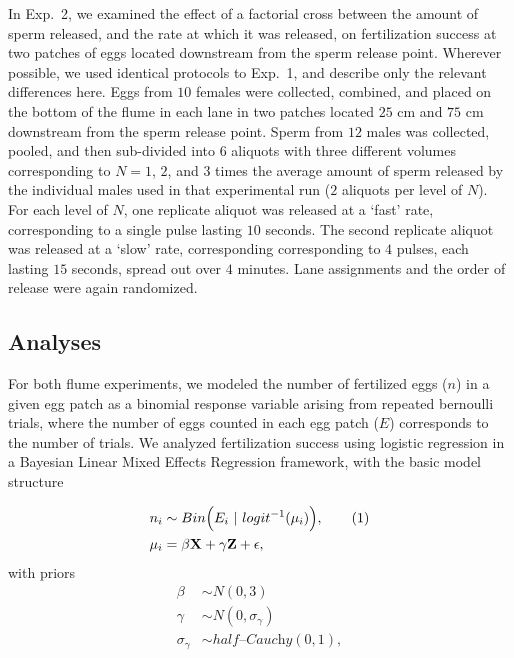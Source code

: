 \documentclass{article}
\newcommand\numberthis{\addtocounter{equation}{1}\tag{\theequation}}
\begin{document}
	In Exp.~2, we examined the effect of a factorial cross between the amount of sperm released, and the rate at which it was released, on fertilization success at two patches of eggs located downstream from the sperm release point. Wherever possible, we used identical protocols to Exp.~1, and describe only the relevant differences here. Eggs from $10$ females were collected, combined, and placed on the bottom of the flume in each lane in two patches located $25$ cm and $75$ cm downstream from the sperm release point. Sperm from $12$ males was collected, pooled, and then sub-divided into $6$ aliquots with three different volumes corresponding to $N = 1$, $2$, and $3$ times the average amount of sperm released by the individual males used in that experimental run ($2$ aliquots per level of $N$). For each level of $N$, one replicate aliquot was released at a `fast' rate, corresponding to a single pulse lasting $10$ seconds. The second replicate aliquot was released at a `slow' rate, corresponding corresponding to $4$ pulses, each lasting $15$ seconds, spread out over $4$ minutes. Lane assignments and the order of release were again randomized.

	\subsection*{Analyses}
	For both flume experiments, we modeled the number of fertilized eggs ($n$) in a given egg patch as a binomial response variable arising from repeated bernoulli trials, where the number of eggs counted in each egg patch ($E$) corresponds to the number of trials. We analyzed fertilization success using logistic regression in a Bayesian Linear Mixed Effects Regression framework, with the basic model structure 

\begin{align*}
	n_i   &\sim Bin\Big(E_i~|~logit^{-1}(\mu_i)\Big), \numberthis\\
	\mu_i &= \beta \mathbf{X} + \gamma \mathbf{Z} + \epsilon,
\end{align*}
\noindent{} with priors
\begin{align*}
	\beta           &\sim N(0,3) \\
	\gamma          &\sim N(0,\sigma_{\gamma}) \\
	\sigma_{\gamma} &\sim \mathit{half} \text{--}\textit{Cauchy}(0,1),
\end{align*}
\end{document}
